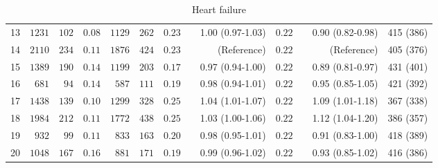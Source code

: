 \documentclass[]{article}\usepackage[]{graphicx}\usepackage[]{color}
\begin{document}
\begin{landscape}
\begin{table}[!tbp]
\begin{center}
\begin{tabular}{lrrrrrrcrrcrr}
13&$1231$&$102$&$0.08$&$1129$&$262$&$0.23$&&1.00 (0.97-1.03)&$0.22$&&0.90 (0.82-0.98)&415 (386)\tabularnewline
14&$2110$&$234$&$0.11$&$1876$&$424$&$0.23$&&(Reference)&$0.22$&&(Reference)&405 (376)\tabularnewline
15&$1389$&$190$&$0.14$&$1199$&$203$&$0.17$&&0.97 (0.94-1.00)&$0.22$&&0.89 (0.81-0.97)&431 (401)\tabularnewline
16&$ 681$&$ 94$&$0.14$&$ 587$&$111$&$0.19$&&0.98 (0.94-1.01)&$0.22$&&0.95 (0.85-1.05)&421 (392)\tabularnewline
17&$1438$&$139$&$0.10$&$1299$&$328$&$0.25$&&1.04 (1.01-1.07)&$0.22$&&1.09 (1.01-1.18)&367 (338)\tabularnewline
18&$1984$&$212$&$0.11$&$1772$&$438$&$0.25$&&1.03 (1.00-1.06)&$0.22$&&1.12 (1.04-1.20)&386 (357)\tabularnewline
19&$ 932$&$ 99$&$0.11$&$ 833$&$163$&$0.20$&&0.98 (0.95-1.01)&$0.22$&&0.91 (0.83-1.00)&418 (389)\tabularnewline
20&$1048$&$167$&$0.16$&$ 881$&$171$&$0.19$&&0.99 (0.96-1.02)&$0.22$&&0.93 (0.85-1.02)&416 (386)\tabularnewline
\hline
\end{tabular}

\caption{Heart failure\label{pre.format}}\end{center}


\end{table}
\end{landscape}
\end{document}
